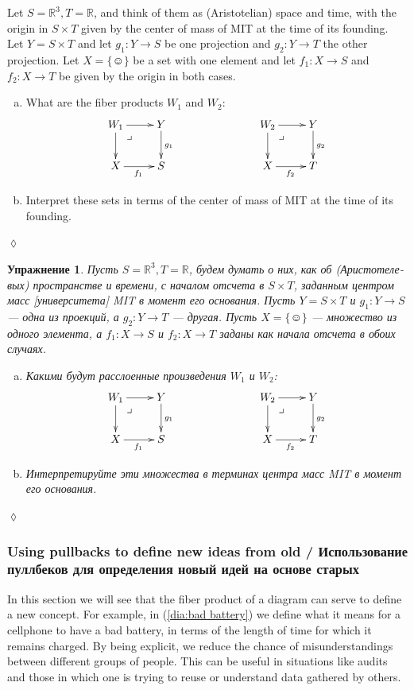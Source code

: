 \documentclass[a4paper]{book}
\makeatletter
\def\RR{{\mathbb R}}
\def\singleton{\{\smiley\}}
\def\to{\rightarrow}
\def\taking{\colon}
\def\ullimit{\ar@{}[rd]|(.3)*+{\lrcorner}}
\theoremstyle{myth}
\newtheorem{excENG}[envENG]{\begin{english}Exercise\end{english}}
\newenvironment{exerciseENG}{\begin{excENG}}{\hspace*{\fill}$\lozenge$\end{excENG}}
\newtheorem{excRUS}[envRUS]{Упражнение}
\newenvironment{exerciseRUS}{\begin{excRUS}}{\hspace*{\fill}$\lozenge$\end{excRUS}}
\def\sexc{\begin{enumerate}[a.)]\setlength{\itemsep}{.1cm}\setlength{\parskip}{.1cm}\item}
\def\next{\item}
\def\endsexc{\end{enumerate}}
\makeatother
\begin{document}
\begin{russian}
\begin{exerciseENG}
Let $S=\RR^3, T=\RR$, and think of them as (Aristotelian) space and time, with the origin in $S\times T$ given by the center of mass of MIT at the time of its founding. Let $Y=S\times T$ and let $g_1\taking Y\to S$ be one projection and $g_2\taking Y\to T$ the other projection. Let $X=\singleton$ be a set with one element and let $f_1\taking X\to S$ and $f_2\taking X\to T$ be given by the origin in both cases. 
\sexc What are the fiber products $W_1$ and $W_2$:
$$
\xymatrix{W_1\ar[r]\ar[d]\ullimit&Y\ar[d]^{g_1}\\X\ar[r]_{f_1}&S}\hspace{1in}
\xymatrix{W_2\ar[r]\ar[d]\ullimit&Y\ar[d]^{g_2}\\X\ar[r]_{f_2}&T}
$$
\next Interpret these sets in terms of the center of mass of MIT at the time of its founding.
\endsexc
\end{exerciseENG}

\begin{exerciseRUS}
Пусть $S=\RR^3, T=\RR$, будем думать о них, как об (Аристотелевых) пространстве и времени, с началом отсчета в $S\times T$, заданным центром масс [университета] MIT в момент его основания. Пусть $Y=S\times T$ и $g_1\taking Y\to S$ — одна из проекций, а $g_2\taking Y\to T$ — другая. Пусть $X=\singleton$ — множество из одного элемента, а $f_1\taking X\to S$ и $f_2\taking X\to T$ заданы как начала отсчета в обоих случаях. 
\sexc Какими будут расслоенные произведения $W_1$ и $W_2$:
$$
\xymatrix{W_1\ar[r]\ar[d]\ullimit&Y\ar[d]^{g_1}\\X\ar[r]_{f_1}&S}\hspace{1in}
\xymatrix{W_2\ar[r]\ar[d]\ullimit&Y\ar[d]^{g_2}\\X\ar[r]_{f_2}&T}
$$
\next Интерпретируйте эти множества в терминах центра масс MIT в момент его основания.
\endsexc
\end{exerciseRUS}


\subsubsection{Using pullbacks to define new ideas from old / Использование пуллбеков для определения новый идей на основе старых}

In this section we will see that the fiber product of a diagram can serve to define a new concept. For example, in (\ref{dia:bad battery}) we define what it means for a cellphone to have a bad battery, in terms of the length of time for which it remains charged. By being explicit, we reduce the chance of misunderstandings between different groups of people. This can be useful in situations like audits and those in which one is trying to reuse or understand data gathered by others.


\end{russian}
\end{document}
